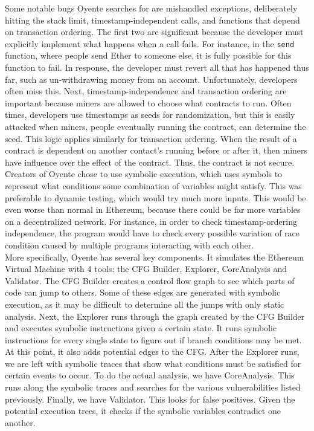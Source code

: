 Some notable bugs Oyente searches for are mishandled exceptions, deliberately hitting the stack limit, timestamp-independent calls, and functions that depend on transaction ordering. The first two are significant because the developer must explicitly implement what happens when a call fails. For instance, in the \texttt{send} function, where people send Ether to someone else, it is fully possible for this function to fail. In response, the developer must revert all that has happened thus far, such as un-withdrawing money from an account. Unfortunately, developers often miss this. Next, timestamp-independence and transaction ordering are important because miners are allowed to choose what contracts to run. Often times, developers use timestamps as seeds for randomization, but this is easily attacked when miners, people eventually running the contract, can determine the seed. This logic applies similarly for transaction ordering. When the result of a contract is dependent on another contact's running before or after it, then miners have influence over the effect of the contract. Thus, the contract is not secure.  \\

Creators of Oyente chose to use symbolic execution, which uses symbols to represent what conditions some combination of variables might satisfy. This was preferable to dynamic testing, which would try much more inputs. This would be even worse than normal in Ethereum, because there could be far more variables on a decentralized network. For instance, in order to check timestamp-ordering independence, the program would have to check every possible variation of race condition caused by multiple programs interacting with each other. \\

More specifically, Oyente has several key components. It simulates the Ethereum Virtual Machine with 4 tools: the CFG Builder, Explorer, CoreAnalysis and Validator. The CFG Builder creates a control flow graph to see which parts of code can jump to others. Some of these edges are generated with symbolic execution, as it may be difficult to determine all the jumps with only static analysis. Next, the Explorer runs through the graph created by the CFG Builder and executes symbolic instructions given a certain state. It runs symbolic instructions for every single state to figure out if branch conditions may be met. At this point, it also adds potential edges to the CFG. After the Explorer runs, we are left with symbolic traces that show what conditions must be satisfied for certain events to occur. To do the actual analysis, we have CoreAnalysis. This runs along the symbolic traces and searches for the various vulnerabilities listed previously. Finally, we have Validator. This looks for false positives. Given the potential execution trees, it checks if the symbolic variables contradict one another. \\

